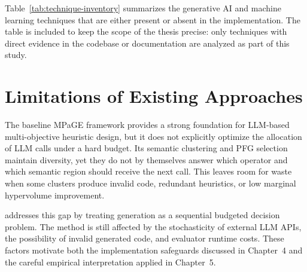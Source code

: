 Table~\ref{tab:technique-inventory} summarizes the generative AI and machine learning techniques that are either present or absent in the implementation. The table is included to keep the scope of the thesis precise: only techniques with direct evidence in the codebase or documentation are analyzed as part of this study.



\section{Limitations of Existing Approaches}

The baseline MPaGE framework provides a strong foundation for LLM-based multi-objective heuristic design, but it does not explicitly optimize the allocation of LLM calls under a hard budget. Its semantic clustering and PFG selection maintain diversity, yet they do not by themselves answer which operator and which semantic region should receive the next call. This leaves room for waste when some clusters produce invalid code, redundant heuristics, or low marginal hypervolume improvement.

\bmab{} addresses this gap by treating generation as a sequential budgeted decision problem. The method is still affected by the stochasticity of external LLM APIs, the possibility of invalid generated code, and evaluator runtime costs. These factors motivate both the implementation safeguards discussed in Chapter~4 and the careful empirical interpretation applied in Chapter~5.
